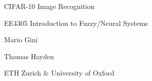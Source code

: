     \begin{titlepage}

    \begin{center}
    \vspace*{6cm}
    \centering
    \Huge
    { CIFAR-10 Image Recognition }
    \vspace{2cm}

    \Huge
    {EE4305 Introduction to Fuzzy/Neural Systems}
    \vspace{0.5cm}
    
    \Large
    {Mario Gini
    	
    Thomas Hayden\\
	}
	\vspace{1cm}
	\Large
	{ETH Zurich \& University of Oxford}
   
    \end{center}
    \end{titlepage}